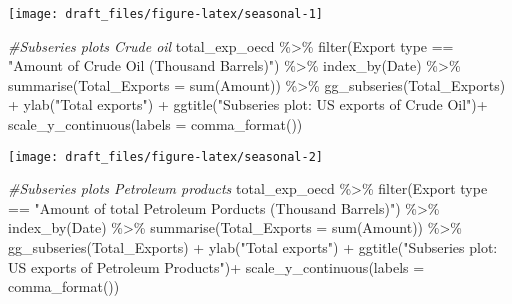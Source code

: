 \documentclass[
]{article}
\newenvironment{Shaded}{\begin{snugshade}}{\end{snugshade}}
\newcommand{\AttributeTok}[1]{\textcolor[rgb]{0.77,0.63,0.00}{#1}}
\newcommand{\CommentTok}[1]{\textcolor[rgb]{0.56,0.35,0.01}{\textit{#1}}}
\newcommand{\FunctionTok}[1]{\textcolor[rgb]{0.00,0.00,0.00}{#1}}
\newcommand{\NormalTok}[1]{#1}
\newcommand{\SpecialCharTok}[1]{\textcolor[rgb]{0.00,0.00,0.00}{#1}}
\newcommand{\StringTok}[1]{\textcolor[rgb]{0.31,0.60,0.02}{#1}}
\begin{document}
\begin{center}\texttt{[image: draft\_files/figure-latex/seasonal-1]} \end{center}

\begin{Shaded}
\begin{Highlighting}[]
\CommentTok{\#Subseries plots Crude oil}
\NormalTok{total\_exp\_oecd }\SpecialCharTok{\%\textgreater{}\%} \FunctionTok{filter}\NormalTok{(}\StringTok{\textasciigrave{}}\AttributeTok{Export type}\StringTok{\textasciigrave{}} \SpecialCharTok{==} \StringTok{"Amount of Crude Oil (Thousand Barrels)"}\NormalTok{) }\SpecialCharTok{\%\textgreater{}\%} 
  \FunctionTok{index\_by}\NormalTok{(Date) }\SpecialCharTok{\%\textgreater{}\%} 
  \FunctionTok{summarise}\NormalTok{(}\AttributeTok{Total\_Exports =} \FunctionTok{sum}\NormalTok{(}\StringTok{\textasciigrave{}}\AttributeTok{Amount}\StringTok{\textasciigrave{}}\NormalTok{)) }\SpecialCharTok{\%\textgreater{}\%} 
  \FunctionTok{gg\_subseries}\NormalTok{(Total\_Exports) }\SpecialCharTok{+} 
  \FunctionTok{ylab}\NormalTok{(}\StringTok{"Total exports"}\NormalTok{) }\SpecialCharTok{+} 
  \FunctionTok{ggtitle}\NormalTok{(}\StringTok{"Subseries plot: US exports of Crude Oil"}\NormalTok{)}\SpecialCharTok{+}
  \FunctionTok{scale\_y\_continuous}\NormalTok{(}\AttributeTok{labels =} \FunctionTok{comma\_format}\NormalTok{())}
\end{Highlighting}
\end{Shaded}

\begin{center}\texttt{[image: draft\_files/figure-latex/seasonal-2]} \end{center}

\begin{Shaded}
\begin{Highlighting}[]
\CommentTok{\#Subseries plots Petroleum products}
\NormalTok{total\_exp\_oecd }\SpecialCharTok{\%\textgreater{}\%} \FunctionTok{filter}\NormalTok{(}\StringTok{\textasciigrave{}}\AttributeTok{Export type}\StringTok{\textasciigrave{}} \SpecialCharTok{==} \StringTok{"Amount of total Petroleum Porducts (Thousand Barrels)"}\NormalTok{) }\SpecialCharTok{\%\textgreater{}\%} 
  \FunctionTok{index\_by}\NormalTok{(Date) }\SpecialCharTok{\%\textgreater{}\%} 
  \FunctionTok{summarise}\NormalTok{(}\AttributeTok{Total\_Exports =} \FunctionTok{sum}\NormalTok{(}\StringTok{\textasciigrave{}}\AttributeTok{Amount}\StringTok{\textasciigrave{}}\NormalTok{)) }\SpecialCharTok{\%\textgreater{}\%} 
  \FunctionTok{gg\_subseries}\NormalTok{(Total\_Exports) }\SpecialCharTok{+} 
  \FunctionTok{ylab}\NormalTok{(}\StringTok{"Total exports"}\NormalTok{) }\SpecialCharTok{+} 
  \FunctionTok{ggtitle}\NormalTok{(}\StringTok{"Subseries plot: US exports of Petroleum Products"}\NormalTok{)}\SpecialCharTok{+}
  \FunctionTok{scale\_y\_continuous}\NormalTok{(}\AttributeTok{labels =} \FunctionTok{comma\_format}\NormalTok{())}
\end{Highlighting}
\end{Shaded}
\end{document}
